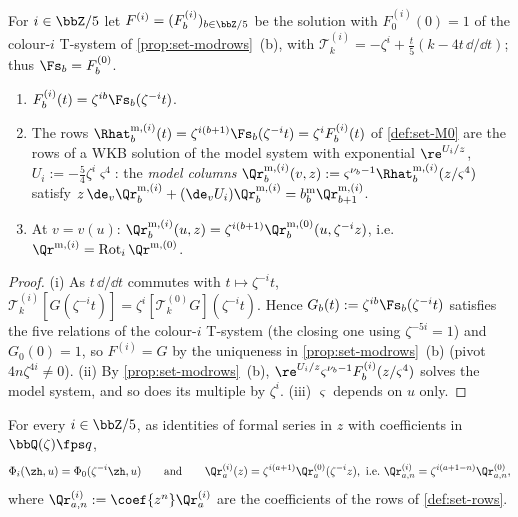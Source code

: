\begin{lem}
\label{lem:gau-colmod}
For $i\in\bbZ/5$ let $F^{(i)}=(F^{(i)}_b)_{b\in\bbZ/5}$ be the solution with $F^{(i)}_0(0)=1$ of the colour-$i$ T-system of \cref{prop:set-modrows}~(b), with $\mathcal T^{(i)}_k=-\zeta^i+\frac t5(k-4t\,\dd/\dd t)$; thus $\Fs_b=F^{(0)}_b$.
\begin{enumerate}
\item $F^{(i)}_b(t)=\zeta^{ib}\Fs_b(\zeta^{-i}t)$.
\item The rows $\Rhat^{\mathrm m,(i)}_b(t)=\zeta^{i(b+1)}\Fs_b(\zeta^{-i}t)=\zeta^iF^{(i)}_b(t)$ of \cref{def:set-M0} are the rows of a WKB solution of the model system with exponential $\re^{U_i/z}$, $U_i:=-\frac54\zeta^i\varsigma^4$: the \emph{model columns} $\Qr^{\mathrm m,(i)}_b(v,z):=\varsigma^{\nu_b-1}\Rhat^{\mathrm m,(i)}_b(z/\varsigma^4)$ satisfy $z\,\de_v\Qr^{\mathrm m,(i)}_b+(\de_vU_i)\Qr^{\mathrm m,(i)}_b=b^{\mathrm m}_b\Qr^{\mathrm m,(i)}_{b+1}$.
\item At $v=v(u)$: $\Qr^{\mathrm m,(i)}_b(u,z)=\zeta^{i(b+1)}\Qr^{\mathrm m,(0)}_b(u,\zeta^{-i}z)$, i.e.\ $\Qr^{\mathrm m,(i)}=\operatorname{Rot}_i\Qr^{\mathrm m,(0)}$.
\end{enumerate}
\end{lem}

\begin{proof}
(i) As $t\,\dd/\dd t$ commutes with $t\mapsto\zeta^{-i}t$, $\mathcal T^{(i)}_k[G(\zeta^{-i}t)]=\zeta^i[\mathcal T^{(0)}_kG](\zeta^{-i}t)$. Hence $G_b(t):=\zeta^{ib}\Fs_b(\zeta^{-i}t)$ satisfies the five relations of the colour-$i$ T-system (the closing one using $\zeta^{-5i}=1$) and $G_0(0)=1$, so $F^{(i)}=G$ by the uniqueness in \cref{prop:set-modrows}~(b) (pivot $4n\zeta^{4i}\neq0$). (ii) By \cref{prop:set-modrows}~(b), $\re^{U_i/z}\varsigma^{\nu_b-1}F^{(i)}_b(z/\varsigma^4)$ solves the model system, and so does its multiple by $\zeta^i$. (iii) $\varsigma$ depends on $u$ only.
\end{proof}

\begin{lem}
\label{lem:gau-colrows}
For every $i\in\bbZ/5$, as identities of formal series in $z$ with coefficients in $\bbQ(\zeta)\fps q$,
\[
\Phi_i(\zh,u)=\Phi_0(\zeta^{-i}\zh,u)\qquad\text{and}\qquad \Qr^{(i)}_a(z)=\zeta^{i(a+1)}\Qr^{(0)}_a(\zeta^{-i}z),\ \text{i.e.}\ \Qr^{(i)}_{a,n}=\zeta^{i(a+1-n)}\Qr^{(0)}_{a,n},
\]
where $\Qr^{(i)}_{a,n}:=\coef{z^n}\Qr^{(i)}_a$ are the coefficients of the rows of \cref{def:set-rows}.
\end{lem}

